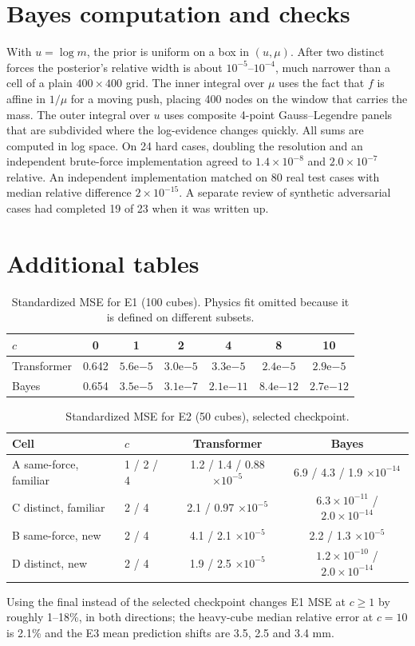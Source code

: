 \documentclass{article}
\begin{document}
\section{Bayes computation and checks}\label{app:bayes}
With $u=\log m$, the prior is uniform on a box in $(u,\mu)$. After two distinct forces the posterior's relative width is about $10^{-5}$--$10^{-4}$, much narrower than a cell of a plain $400\times400$ grid. The inner integral over $\mu$ uses the fact that $f$ is affine in $1/\mu$ for a moving push, placing 400 nodes on the window that carries the mass. The outer integral over $u$ uses composite 4-point Gauss--Legendre panels that are subdivided where the log-evidence changes quickly. All sums are computed in log space. On 24 hard cases, doubling the resolution and an independent brute-force implementation agreed to $1.4\times10^{-8}$ and $2.0\times10^{-7}$ relative. An independent implementation matched on 80 real test cases with median relative difference $2\times10^{-15}$. A separate review of synthetic adversarial cases had completed 19 of 23 when it was written up.

\section{Additional tables}
\begin{table}[ht]
\centering\small
\caption{Standardized MSE for E1 (100 cubes). Physics fit omitted because it is defined on different subsets.}
\begin{tabular}{lcccccc}
\toprule
$c$ & 0 & 1 & 2 & 4 & 8 & 10\\
\midrule
Transformer & 0.642 & $5.6\mathrm e{-5}$ & $3.0\mathrm e{-5}$ & $3.3\mathrm e{-5}$ & $2.4\mathrm e{-5}$ & $2.9\mathrm e{-5}$\\
Bayes & 0.654 & $3.5\mathrm e{-5}$ & $3.1\mathrm e{-7}$ & $2.1\mathrm e{-11}$ & $8.4\mathrm e{-12}$ & $2.7\mathrm e{-12}$\\
\bottomrule
\end{tabular}
\end{table}
\begin{table}[ht]
\centering\small
\caption{Standardized MSE for E2 (50 cubes), selected checkpoint.}
\begin{tabular}{llcc}
\toprule
Cell & $c$ & Transformer & Bayes\\
\midrule
A same-force, familiar & 1 / 2 / 4 & 1.2 / 1.4 / 0.88 $\times10^{-5}$ & 6.9 / 4.3 / 1.9 $\times10^{-14}$\\
C distinct, familiar & 2 / 4 & 2.1 / 0.97 $\times10^{-5}$ & $6.3\times10^{-11}$ / $2.0\times10^{-14}$\\
B same-force, new & 2 / 4 & 4.1 / 2.1 $\times10^{-5}$ & 2.2 / 1.3 $\times10^{-5}$\\
D distinct, new & 2 / 4 & 1.9 / 2.5 $\times10^{-5}$ & $1.2\times10^{-10}$ / $2.0\times10^{-14}$\\
\bottomrule
\end{tabular}
\end{table}
Using the final instead of the selected checkpoint changes E1 MSE at $c\ge1$ by roughly 1--18\%, in both directions; the heavy-cube median relative error at $c=10$ is 2.1\% and the E3 mean prediction shifts are 3.5, 2.5 and 3.4 mm.
\end{document}
